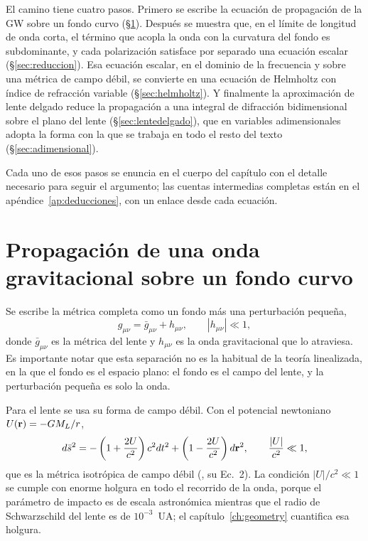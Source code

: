 \documentclass[11pt,a4paper,openany]{book}
\begin{document}
El camino tiene cuatro pasos. Primero se escribe la ecuaci\'on de propagaci\'on
de la GW sobre un fondo curvo (\S\ref{sec:propagacion}). Despu\'es se muestra
que, en el l\'imite de longitud de onda corta, el t\'ermino que acopla la onda
con la curvatura del fondo es subdominante, y cada polarizaci\'on satisface por
separado una ecuaci\'on escalar (\S\ref{sec:reduccion}). Esa ecuaci\'on escalar,
en el dominio de la frecuencia y sobre una m\'etrica de campo d\'ebil, se
convierte en una ecuaci\'on de Helmholtz con \'indice de refracci\'on variable
(\S\ref{sec:helmholtz}). Y finalmente la aproximaci\'on de lente delgado
reduce la propagaci\'on a una integral de difracci\'on bidimensional sobre el
plano del lente (\S\ref{sec:lentedelgado}), que en variables adimensionales
adopta la forma con la que se trabaja en todo el resto del texto
(\S\ref{sec:adimensional}).

Cada uno de esos pasos se enuncia en el cuerpo del cap\'itulo con el detalle
necesario para seguir el argumento; las cuentas intermedias completas est\'an
en el ap\'endice~\ref{ap:deducciones}, con un enlace desde cada ecuaci\'on.

\section{Propagaci\'on de una onda gravitacional sobre un fondo curvo}
\label{sec:propagacion}

Se escribe la m\'etrica completa como un fondo m\'as una perturbaci\'on
peque\~na,
\begin{equation}
  g_{\mu\nu}=\bar g_{\mu\nu}+h_{\mu\nu},
  \qquad |h_{\mu\nu}|\ll1 ,
  \label{eq:split}
\end{equation}
donde $\bar g_{\mu\nu}$ es la m\'etrica del lente y $h_{\mu\nu}$ es la onda
gravitacional que lo atraviesa. Es importante notar que esta separaci\'on no
es la habitual de la teor\'ia linealizada, en la que el fondo es el espacio
plano: el fondo es el campo del lente, y la perturbaci\'on peque\~na es solo
la onda.

Para el lente se usa su forma de campo d\'ebil. Con el potencial newtoniano
$U(\vb r)=-GM_L/r$,
\begin{equation}
  d\bar s^{2}=-\left(1+\frac{2U}{c^{2}}\right)c^{2}dt^{2}
  +\left(1-\frac{2U}{c^{2}}\right)d\vb r^{2},
  \qquad \frac{|U|}{c^{2}}\ll1 ,
  \label{eq:weakfield}
\end{equation}
que es la m\'etrica isotr\'opica de campo d\'ebil (\citealp{Takahashi2003}, su
Ec.~2). La condici\'on $|U|/c^{2}\ll1$ se cumple con enorme holgura en todo el
recorrido de la onda, porque el par\'ametro de impacto es de escala
astron\'omica mientras que el radio de Schwarzschild del lente es de
$10^{-3}$~UA; el cap\'itulo~\ref{ch:geometry} cuantifica esa holgura.
\end{document}

